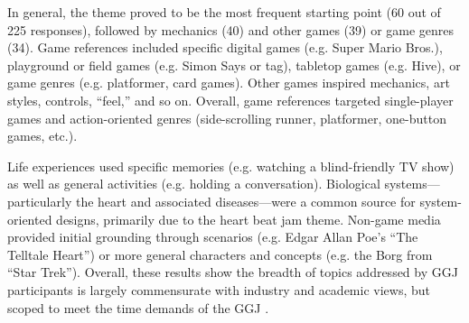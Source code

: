 \documentclass{sig-alternate}
\begin{document}
In general, the theme proved to be the most frequent starting point (60 out of 225 responses), followed by mechanics (40) and other games (39) or game genres (34).
Game references included specific digital games (e.g. Super Mario Bros.), playground or field games (e.g. Simon Says or tag), tabletop games (e.g. Hive), or game genres (e.g. platformer, card games). Other games inspired mechanics, art styles, controls, ``feel,'' and so on. 
Overall, game references targeted single-player games and action-oriented genres (side-scrolling runner, platformer, one-button games, etc.).

Life experiences used specific memories (e.g. watching a blind-friendly TV show) as well as general activities (e.g. holding a conversation).
Biological systems---particularly the heart and associated diseases---were a common source for system-oriented designs, primarily due to the heart beat jam theme.
Non-game media provided initial grounding through scenarios (e.g. Edgar Allan Poe's ``The Telltale Heart'') or more general characters and concepts (e.g. the Borg from ``Star Trek'').
Overall, these results show the breadth of topics addressed by GGJ participants is largely commensurate with industry and academic views, but scoped to meet the time demands of the GGJ \cite{bogost2011:howto}.

\end{document}
